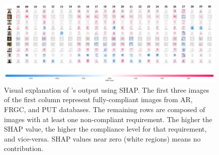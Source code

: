 \begin{figure}[ht]
    \centering
    \includegraphics[width=\linewidth]{images/shap.png}
    \caption{Visual explanation of \methodname's output using SHAP. The first three images of the first column represent fully-compliant images from AR, FRGC, and PUT databases. The remaining rows are composed of images with at least one non-compliant requirement. The higher the SHAP value, the higher the compliance level for that requirement, and vice-versa. SHAP values near zero (white regions) means no contribution.}
    \label{fig:shap}
\end{figure}

